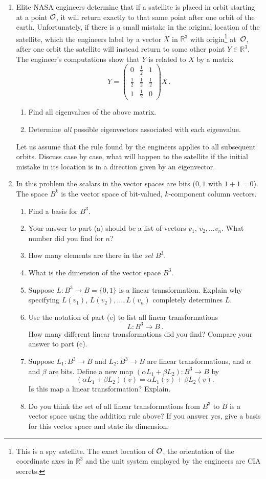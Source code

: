\begin{enumerate}
\item 
Elite NASA engineers determine that if a satellite is placed in orbit starting at a point ${\cal O}$, it will return
exactly to that same point after one orbit of the earth. Unfortunately, if there is a small mistake in the original location of the 
satellite, which the engineers label by a vector $X$ in ${\mathbb R}^3$ with origin\footnote{This is a spy satellite. The exact location of ${\cal O}$, the orientation of the coordinate axes in ${\mathbb R}^3$ and the unit system employed by the engineers are CIA secrets.} 
at~${\cal O}$, after one orbit the satellite will instead return to some other point $Y\in {\mathbb R}^3$. The engineer's computations
show that $Y$ is related to $X$ by a matrix
$$
Y = \begin{pmatrix} 0&\frac12 & 1 \\[2mm] \frac12 &\frac12 &\frac 12 \\[2mm] 1 & \frac 12 &0\end{pmatrix} X\, .
$$
\begin{enumerate}
\item Find all eigenvalues of the above matrix.
\item Determine  {\it all} possible eigenvectors associated with each eigenvalue.
\end{enumerate}
Let us assume that the rule found by the engineers applies to all subsequent orbits. 
Discuss case by case, what will happen to the satellite if the initial mistake in its location
is in a direction given by an eigenvector. 
\item
In this problem the scalars in the vector spaces are bits ($0,1$ with $1+1=0$). The space $B^k$ is the vector space of bit-valued, $k$-component column vectors.
\begin{enumerate}
\item
Find a basis for $B^3$. 
\item Your answer to part (a) should be a list of vectors $v_1$, $v_2,\ldots v_n$. What number did you find for $n$? 
\item How many elements are there in the {\it set} $B^3$. 
\item What is the dimension of the vector space $B^3$. 
\item Suppose $L:B^3\to B=\{0,1\}$ is a linear transformation. Explain why specifying $L(v_1)$, $L(v_2),\ldots,L(v_n)$ completely determines $L$. 
\item Use the notation of 
part (e) to list {all} linear transformations $$L:B^3\to B\, .$$
How many different linear transformations did you find? Compare your answer to part (c). 
\item Suppose $L_1:B^3\to B$ and $L_2: B^3\to B$ are linear transformations, and $\alpha$ and $\beta$ are bits.
Define a new map 
$(\alpha L_1+\beta L_2):B^3\to B$ by $$(\alpha L_1+\beta L_2)(v)=\alpha L_1(v)+\beta L_2(v).$$ Is this map a linear transformation? Explain.
\item Do you think the set of all linear transformations from $B^3$ to $B$ is a vector space using the addition rule above? If you answer yes, 
give a basis for this vector space and state its dimension.
\end{enumerate}


\end{enumerate}
